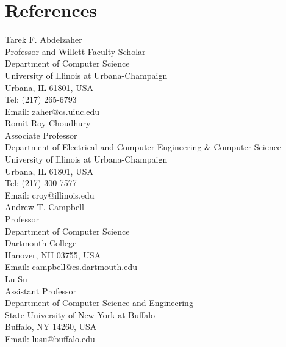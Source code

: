 \section{\sc References}
Tarek F. Abdelzaher\\
Professor and Willett Faculty Scholar\\
Department of Computer Science\\
University of Illinois at Urbana-Champaign\\
Urbana, IL 61801, USA\\
Tel: (217) 265-6793\\
Email: zaher@cs.uiuc.edu\\

Romit Roy Choudhury\\
Associate Professor\\
Department of Electrical and Computer Engineering \& Computer Science\\
University of Illinois at Urbana-Champaign\\
Urbana, IL 61801, USA\\
Tel: (217) 300-7577\\
Email: croy@illinois.edu\\


Andrew T. Campbell\\
Professor\\
Department of Computer Science\\
Dartmouth College\\
Hanover, NH 03755, USA\\
Email: campbell@cs.dartmouth.edu\\

Lu Su\\
Assistant Professor\\
Department of Computer Science and Engineering\\
State University of New York at Buffalo\\
Buffalo, NY 14260, USA\\
Email: lusu@buffalo.edu\\